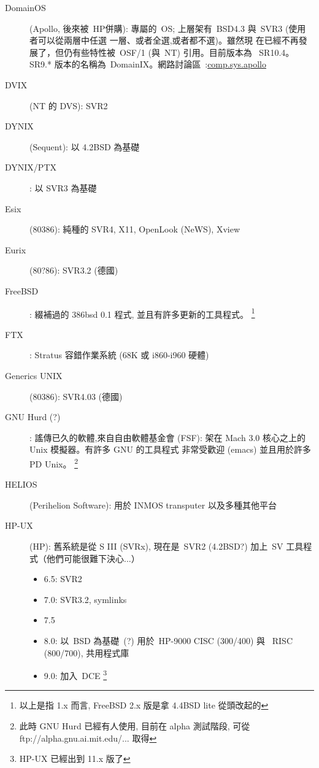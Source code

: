 \documentclass{article}
\begin{document}
\begin{CJK*}{Bg5}{ming}
\begin{description}
      \item [DomainOS] (Apollo, 後來被~HP併購): 專屬的~OS; 
	上層架有~BSD4.3 與~SVR3 (使用者可以從兩層中任選
	一層、或者全選,或者都不選)。雖然現
      在已經不再發展了，但仍有些特性被~OSF/1 (與~NT) 引用。目前版本為
      ~SR10.4。SR9.* 版本的名稱為~DomainIX。網路討論區~:\url{comp.sys.apollo}

      \item [DVIX] (NT 的 DVS):  SVR2

      \item [DYNIX] (Sequent): 以 4.2BSD 為基礎

      \item [DYNIX/PTX]: 以 SVR3 為基礎

      \item [Esix] (80386):  純種的 SVR4, X11, OpenLook (NeWS), Xview

      \item [Eurix] (80?86):  SVR3.2 (德國)

      \item [FreeBSD]: 綴補過的 386bsd 0.1 程式, 並且有許多更新的工具程式。
      \footnote{以上是指 1.x 而言, FreeBSD 2.x 版是拿 4.4BSD lite 從頭改起的}

      \item [FTX]: Stratus 容錯作業系統 (68K 或 i860-i960 硬體)

      \item [Generics UNIX] (80386): SVR4.03 (德國)

      \item [GNU Hurd (?)]: 謠傳已久的軟體,來自自由軟體基金會 (FSF):
         架在 Mach 3.0 核心之上的 Unix 模擬器。有許多 GNU 的工具程式
         非常受歡迎 (emacs) 並且用於許多 PD Unix。
         \footnote{此時 GNU Hurd 已經有人使用, 目前在 alpha 測試階段,
                 可從 ftp://alpha.gnu.ai.mit.edu/... 取得}

      \item [HELIOS] (Perihelion Software): 用於 INMOS transputer 以及多種其他平台

      \item [HP-UX] (HP):  舊系統是從 S III (SVRx), 現在是~SVR2 (4.2BSD?) 加上~SV
         工具程式（他們可能很難下決心...）
\begin{itemize}
         \item 6.5: SVR2
         \item 7.0: SVR3.2, symlinks
         \item 7.5
         \item 8.0: 以~BSD 為基礎~(?) 用於~HP-9000 CISC (300/400) 與
		~RISC (800/700), 共用程式庫
         \item 9.0: 加入~DCE
         \footnote{HP-UX 已經出到 11.x 版了}
\end{itemize}


\end{description}
\end{CJK*}
\end{document}
